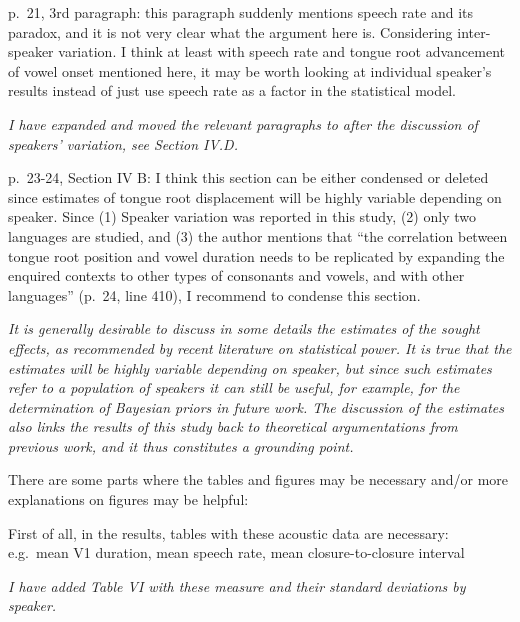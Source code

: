 \documentclass[]{article}
\begin{document}
p.~21, 3rd paragraph: this paragraph suddenly mentions speech rate and
its paradox, and it is not very clear what the argument here is.
Considering inter-speaker variation. I think at least with speech rate
and tongue root advancement of vowel onset mentioned here, it may be
worth looking at individual speaker's results instead of just use speech
rate as a factor in the statistical model.

\begin{adjustwidth}{1cm}{} \textit{
I have expanded and moved the relevant paragraphs to after the discussion of speakers' variation, see Section IV.D.
} \end{adjustwidth}

p.~23-24, Section IV B: I think this section can be either condensed or
deleted since estimates of tongue root displacement will be highly
variable depending on speaker. Since (1) Speaker variation was reported
in this study, (2) only two languages are studied, and (3) the author
mentions that ``the correlation between tongue root position and vowel
duration needs to be replicated by expanding the enquired contexts to
other types of consonants and vowels, and with other languages'' (p.~24,
line 410), I recommend to condense this section.

\begin{adjustwidth}{1cm}{} \textit{
It is generally desirable to discuss in some details the estimates of the sought effects, as recommended by recent literature on statistical power. It is true that the estimates will be highly variable depending on speaker, but since such estimates refer to a population of speakers it can still be useful, for example, for the determination of Bayesian priors in future work. The discussion of the estimates also links the results of this study back to theoretical argumentations from previous work, and it thus constitutes a grounding point.
} \end{adjustwidth}

There are some parts where the tables and figures may be necessary
and/or more explanations on figures may be helpful:

First of all, in the results, tables with these acoustic data are
necessary: e.g.~mean V1 duration, mean speech rate, mean
closure-to-closure interval

\begin{adjustwidth}{1cm}{} \textit{
I have added Table VI with these measure and their standard deviations by speaker.
} \end{adjustwidth}
\end{document}
